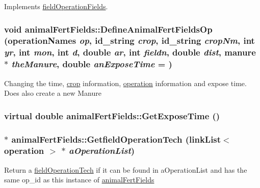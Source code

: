 Implements \hyperlink{classfield_operation_fields_ae5d8585b7e57196ce3801eed29677b3e}{fieldOperationFields}.\hypertarget{classanimal_fert_fields_a010ea67729173cb9e0de5aca455da205}{
\subsubsection[{DefineAnimalFertFieldsOp}]{\setlength{\rightskip}{0pt plus 5cm}void animalFertFields::DefineAnimalFertFieldsOp ({\bf operationNames} {\em op}, \/  {\bf id\_\-string} {\em crop}, \/  {\bf id\_\-string} {\em cropNm}, \/  int {\em yr}, \/  int {\em mon}, \/  int {\em d}, \/  double {\em ar}, \/  int {\em fieldn}, \/  double {\em dist}, \/  {\bf manure} $\ast$ {\em theManure}, \/  double {\em anExposeTime} = {})}}
\label{classanimal_fert_fields_a010ea67729173cb9e0de5aca455da205}
Changing the time, \hyperlink{classcrop}{crop} information, \hyperlink{classoperation}{operation} information and expose time. Does also create a new Manure \hypertarget{classanimal_fert_fields_a226a783cf10a154797837a99dc6a6896}{
\subsubsection[{GetExposeTime}]{\setlength{\rightskip}{0pt plus 5cm}virtual double animalFertFields::GetExposeTime ()}}
\label{classanimal_fert_fields_a226a783cf10a154797837a99dc6a6896}
\hypertarget{classanimal_fert_fields_a92bb741105761340a580dba156326c93}{
\subsubsection[{GetfieldOperationTech}]{ $\ast$ animalFertFields::GetfieldOperationTech ({\bf linkList}$<$ {\bf operation} $>$ $\ast$ {\em aOperationList})}}
\label{classanimal_fert_fields_a92bb741105761340a580dba156326c93}
Return a \hyperlink{classfield_operation_tech}{fieldOperationTech} if it can be found in aOperationList and has the same op\_\-id as this instance of \hyperlink{classanimal_fert_fields}{animalFertFields} 

